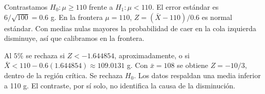 Contrastamos $H_0:\mu\ge110$ frente a $H_1:\mu<110$.
El error estándar es $6/\sqrt{100}=0.6$ g. En la frontera
$\mu=110$, $Z=(\bar X-110)/0.6$ es normal estándar.
Con medias nulas mayores la probabilidad de caer en
la cola izquierda disminuye, así que calibramos en la frontera.

Al $5\%$ se rechaza si $Z<-1.644854$, aproximadamente,
o si $\bar X<110-0.6(1.644854)\approx109.0131$ g.
Con $\bar x=108$ se obtiene $Z=-10/3$, dentro de la región
crítica. Se rechaza $H_0$. Los datos respaldan una media
inferior a 110 g. El contraste, por sí solo, no identifica
la causa de la disminución.
